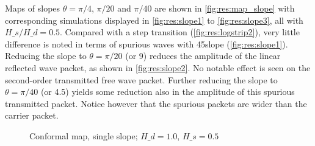 %
%
%


Maps of slopes $\theta=\pi/4$, $\pi/20$ and $\pi/40$ are shown in \autoref{fig:res:map_slope} with corresponding simulations displayed in \autoref{fig:res:slope1} to \ref{fig:res:slope3}, all with $H\_s/H\_d = 0.5$.
Compared with a step transition (\autoref{fig:res:logstrip2}), very little difference is noted in terms of spurious waves  with 45\textdegree slope (\autoref{fig:res:slope1}). 
Reducing the slope to $\theta=\pi/20$ (or 9\textdegree) reduces the amplitude of the linear reflected wave packet, as shown in \autoref{fig:res:slope2}. 
No notable effect is seen on the second-order transmitted free wave packet.
Further reducing the slope to $\theta=\pi/40$ (or 4.5\textdegree) yields some reduction also in the amplitude of this spurious transmitted packet.
Notice however that the spurious packets are wider than the carrier packet.



\begin{figure}[H]%
\centering
{}%
%
%
\caption{Conformal map, single slope; $H\_d = 1.0$, $H\_s = 0.5$}%
\label{fig:res:map_slope}%
\end{figure}

